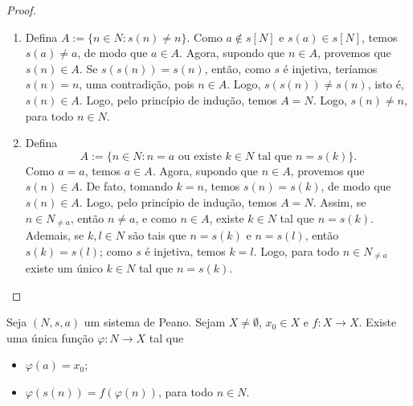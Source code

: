 \begin{proof}
    \leavevmode
        \begin{enumerate}[leftmargin=*, align=left, label=\textbf{(\alph*)}]
            \item Defina $A := \{n \in N : s(n) \neq n\}$. Como $a \notin s[N]$ e $s(a) \in s[N]$, temos $s(a) \neq a$, de modo que $a \in A$. Agora, supondo que $n \in A$, provemos que $s(n) \in A$. Se $s(s(n)) = s(n)$, então, como $s$ é injetiva, teríamos $s(n)=n$, uma contradição, pois $n \in A$. Logo, $s(s(n)) \neq s(n)$, isto é, $s(n) \in A$. Logo, pelo princípio de indução, temos $A = N$. Logo, $s(n) \neq n$, para todo $n \in N$. \blackproof
            \item Defina
                \[
                    A := \{n \in N : n=a \text{ ou existe } k \in N \text{ tal que } n=s(k)\}.
                \]
            Como $a=a$, temos $a \in A$. Agora, supondo que $n \in A$, provemos que $s(n) \in A$. De fato, tomando $k=n$, temos $s(n)=s(k)$, de modo que $s(n) \in A$. Logo, pelo princípio de indução, temos $A=N$. Assim, se $n \in N_{\neq a}$, então $n \neq a$, e como $n \in A$, existe $k \in N$ tal que $n=s(k)$. Ademais, se $k,l \in N$ são tais que $n=s(k)$ e $n=s(l)$, então $s(k)=s(l)$; como $s$ é injetiva, temos $k=l$. Logo, para todo $n \in N_{\neq a}$ existe um único $k \in N$ tal que $n=s(k)$. \blackproof
        \end{enumerate}
\end{proof}

\begin{theorem}[Recursão] \label{teo.set:recursao_peano}
    Seja $(N,s,a)$ um sistema de Peano. Sejam $X \neq \emptyset$, $x_0 \in X$ e $f:X \to X$. Existe uma única função $\varphi : N \to X$ tal que
        \begin{itemize}
            \item $\varphi(a) = x_0$;
            \item $\varphi(s(n)) = f(\varphi(n))$, para todo $n \in N$.
        \end{itemize}
\end{theorem}

